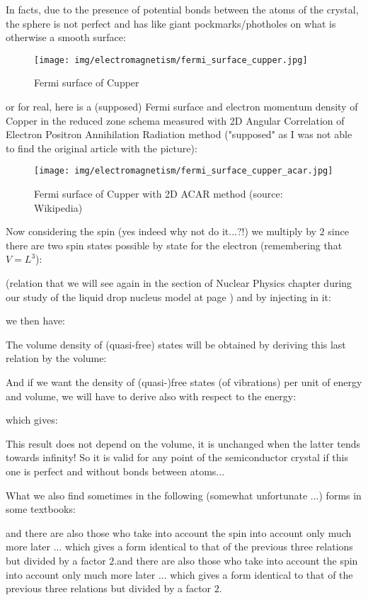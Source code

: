 	In facts, due to the presence of potential bonds between the atoms of the crystal, the sphere is not perfect and has like giant pockmarks/photholes on what is otherwise a smooth surface:
	\begin{figure}[H]
		\centering
		\texttt{[image: img/electromagnetism/fermi\_surface\_cupper.jpg]}
		\caption{Fermi surface of Cupper}
	\end{figure}
	or for real, here is a (supposed) Fermi surface and electron momentum density of Copper in the reduced zone schema measured with 2D Angular Correlation of Electron Positron Annihilation Radiation method ("supposed" as I was not able to find the original article with the picture):
	\begin{figure}[H]
		\centering
		\texttt{[image: img/electromagnetism/fermi\_surface\_cupper\_acar.jpg]}
		\caption[Fermi surface of Cupper with 2D ACAR method]{Fermi surface of Cupper with 2D ACAR method (source: Wikipedia)}
	\end{figure}
	Now considering the spin (yes indeed why not do it...?!) we multiply by $2$ since there are two spin states possible by state for the electron\label{density of states factor} (remembering that $V=L^3$):
	
	(relation that we will see again in the section of Nuclear Physics chapter during our study of the liquid drop nucleus model at page \pageref{liquid drop model}) and by injecting in it:
	
	we then have:
	
	The volume density of (quasi-free) states will be obtained by deriving this last relation by the volume:
	
	And if we want the density of (quasi-)free states (of vibrations) per unit of energy and volume, we will have to derive also with respect to the energy:
	
	which gives:
	
	This result does not depend on the volume, it is unchanged when the latter tends towards infinity! So it is valid for any point of the semiconductor crystal if this one is perfect and without bonds between atoms...
	
	What we also find sometimes in the following (somewhat unfortunate ...) forms in some textbooks:
	
	and there are also those who take into account the spin into account only much more later ... which gives a form identical to that of the previous three relations but divided by a factor $2$.and there are also those who take into account the spin into account only much more later ... which gives a form identical to that of the previous three relations but divided by a factor $2$.
	
